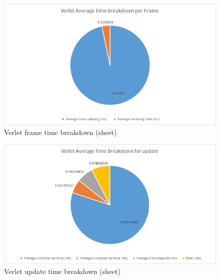     \begin{figure}
    \begin{center}
      \includegraphics[scale=.9]{Figures/sheet_v_ft}
    \end{center}
    \caption{Verlet frame time breakdown (sheet)}
    \label{fig:v ft sheet}
  \end{figure}
  
    \begin{figure}
    \begin{center}
      \includegraphics[scale=.9]{Figures/sheet_v_ut}
    \end{center}
    \caption{Verlet update time breakdown (sheet)}
    \label{fig:v ut sheet}
  \end{figure}
  

